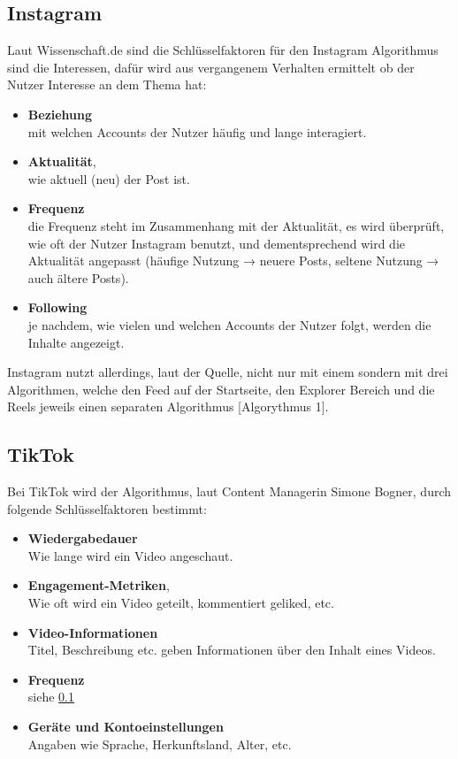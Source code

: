 \documentclass[12pt]{report}
\begin{document}
\subsection{Instagram}
\label{AlgInsta}
Laut Wissenschaft.de sind die Schlüsselfaktoren für den Instagram Algorithmus sind die 
Interessen,
 dafür wird aus vergangenem Verhalten ermittelt ob der Nutzer Interesse an dem Thema hat:
\begin{itemize}
	\item \textbf{Beziehung}\\
	mit welchen Accounts der Nutzer häufig und lange interagiert.
	\item \textbf{Aktualität},\\
	wie aktuell (neu) der Post ist.
	\item \textbf{Frequenz}\\
	die Frequenz steht im Zusammenhang mit der Aktualität, es wird überprüft, wie oft der Nutzer Instagram benutzt, und dementsprechend wird die Aktualität angepasst (häufige Nutzung → neuere Posts, seltene Nutzung → auch ältere Posts).
	\item \textbf{Following}\\
	je nachdem, wie vielen und welchen Accounts der Nutzer folgt, werden die Inhalte angezeigt.
\end{itemize}


Instagram nutzt allerdings, laut der Quelle, nicht nur mit einem sondern mit drei Algorithmen, welche den Feed auf der Startseite, den Explorer Bereich und die Reels jeweils einen separaten Algorithmus [Algorythmus 1].

\subsection{TikTok}
\label{AlgTikTok}
Bei TikTok wird der Algorithmus, laut Content Managerin Simone Bogner, durch folgende Schlüsselfaktoren bestimmt:
\begin{itemize}
	\item \textbf{Wiedergabedauer}\\
	Wie lange wird ein Video angeschaut.
	\item \textbf{Engagement-Metriken},\\
	Wie oft wird ein Video geteilt, kommentiert geliked, etc.
	\item \textbf{Video-Informationen}\\
	Titel, Beschreibung etc. geben Informationen über den Inhalt eines Videos.
	\item \textbf{Frequenz}\\
	siehe \ref{AlgInsta}
	\item \textbf{Geräte und Kontoeinstellungen}\\
	Angaben wie Sprache, Herkunftsland, Alter, etc.
\end{itemize}
\end{document}
